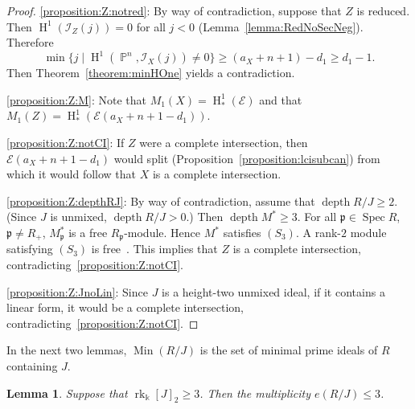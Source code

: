 \documentclass[11pt,a4paper]{amsart}
\theoremstyle{plain}
\newtheorem{lemma}[equation]{Lemma}
\theoremstyle{definition}
\newcommand{\calE}{\mathcal E}
\newcommand{\calI}{\mathcal I}
\newcommand{\frakp}{{\mathfrak p}}
\DeclareMathOperator{\rank}{rk}
\DeclareMathOperator{\projective}{\mathbb{P}}
\DeclareMathOperator{\Spec}{Spec}
\DeclareMathOperator{\Min}{Min}
\DeclareMathOperator{\depth}{depth}
\DeclareMathOperator{\homology}{H}
\begin{document}
\begin{proof}
%
\eqref{proposition:Z:notred}:
By way of contradiction, suppose that $Z$ is reduced. Then
$\homology^1(\calI_Z(j)) = 0$ for all $j<0$
(Lemma~\ref{lemma:RedNoSecNeg}).
Therefore
\[
\min\{j \mid \homology^1(\projective^n, \calI_X(j ) ) \neq 0 \} 
\geq (a_X+n+1)-d_1 \geq d_1-1.
\]
Then Theorem~\ref{theorem:minHOne} yields a contradiction.

\eqref{proposition:Z:M}:
Note that $M_1(X)  = \homology^1_*(\calE)$ and 
that $M_1(Z)  = \homology^1_*(\calE(a_X+n+1-d_1))$.

\eqref{proposition:Z:notCI}:
If $Z$ were a complete intersection, then 
$\calE(a_X+n+1-d_1)$ would split (Proposition~\ref{proposition:lcisubcan})
from which it would follow that $X$ is a complete intersection.

\eqref{proposition:Z:depthRJ}:
By way of contradiction, assume that $\depth R/J \geq 2$. (Since $J$ is
unmixed, $\depth R/J >0$.) Then $\depth M^* \geq 3$. For all 
$\frakp \in \Spec R$, $\frakp \neq R_+$, $M^*_\frakp$ is a free
$R_\frakp$-module. Hence $M^*$ satisfies $(S_3)$. A rank-$2$ module
satisfying $(S_3)$ is free~\cite[Theorem~1.1]{EvansGriffithSyzProb1981}.
This implies that $Z$ is a complete intersection,
contradicting~\eqref{proposition:Z:notCI}.

\eqref{proposition:Z:JnoLin}: Since $J$ is a height-two unmixed ideal, if
it contains a linear form, it would be
a complete intersection, contradicting~\eqref{proposition:Z:notCI}.
%
\end{proof}

In the next two lemmas, $\Min(R/J)$ is the set of minimal prime ideals of
$R$ containing $J$.
\begin{lemma}
\label{lemma:3quadMult}
Suppose that  $\rank_\Bbbk[J]_2 \geq 3$.
Then the multiplicity $e(R/J) \leq 3$.
\end{lemma}
\end{document}
